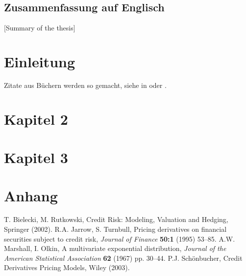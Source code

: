 \documentclass[german,a4paper,12pt,oneside]{scrbook}
\theoremstyle{definition}
\theoremstyle{definition}
\theoremstyle{definition}
\theoremstyle{definition}
\theoremstyle{definition}
\theoremstyle{definition}
\begin{document}
\section*{Zusammenfassung auf Englisch}
[Summary of the thesis]
\newpage
\tableofcontents  


\chapter{Einleitung}  \setcounter{page}{1}   %
Zitate aus B\"uchern werden so gemacht, siehe in \cite{schoenbucher03} oder \cite{marshall67}.

\chapter{Kapitel 2}
\chapter{Kapitel 3}
\chapter{Anhang}
\begin{thebibliography}{XX}
T. Bielecki, M. Rutkowski, Credit Risk: Modeling, Valuation and Hedging, Springer (2002).
 R.A. Jarrow, S. Turnbull, Pricing derivatives on financial securities subject to credit risk, {\it Journal of Finance} {\bf 50:1} (1995) 53--85.
 A.W. Marshall, I. Olkin, A multivariate exponential distribution, {\it Journal of the American Statistical Association} {\bf 62} (1967) pp. 30--44.
 P.J. Sch\"onbucher, Credit Derivatives Pricing Models, Wiley (2003).\end{thebibliography}
\end{document}
